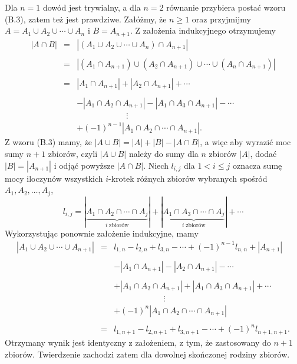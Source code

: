 Dla $n=1$ dowód jest trywialny, a dla $n=2$ równanie przybiera postać wzoru (B.3), zatem też jest prawdziwe. Załóżmy, że $n\ge 1$ oraz przyjmijmy $A=A_1\cup A_2\cup\cdots\cup A_n$ i $B=A_{n+1}$. Z założenia indukcyjnego otrzymujemy
\[
	\begin{array}{rcl}
		|A\cap B| &=& |(A_1\cup A_2\cup\cdots\cup A_n)\cap A_{n+1}| \\\\
		&=& |(A_1\cap A_{n+1})\cup (A_2\cap A_{n+1})\cup\cdots\cup (A_n\cap A_{n+1})| \\\\
		&=& |A_1\cap A_{n+1}|+|A_2\cap A_{n+1}|+\cdots \\\\
		&& -|A_1\cap A_2\cap A_{n+1}|-|A_1\cap A_3\cap A_{n+1}|-\cdots \\
		&& \hspace{1in}\vdots \\
		&& +(-1)^{n-1}|A_1\cap A_2\cap\cdots\cap A_{n+1}|.
	\end{array}
\]
Z wzoru (B.3) mamy, że $|A\cup B|=|A|+|B|-|A\cap B|$, a więc aby wyrazić moc sumy $n+1$ zbiorów, czyli $|A\cup B|$ należy do sumy dla $n$ zbiorów $|A|$, dodać $|B|=|A_{n+1}|$ i odjąć powyższe $|A\cap B|$. Niech $l_{i,j}$ dla $1<i\le j$ oznacza sumę mocy iloczynów wszystkich $i$-krotek różnych zbiorów wybranych spośród $A_1,A_2,\dots,A_j$,
\[
	l_{i,j} = |\underbrace{A_1\cap A_2\cap\cdots\cap A_j}_{i\mathrm{\;zbiorów}}| + |\underbrace{A_1\cap A_3\cap\cdots\cap A_j}_{i\mathrm{\;zbiorów}}| + \cdots
\]
Wykorzystując ponownie założenie indukcyjne, mamy
\[
	\begin{array}{rcl}
		|A_1\cup A_2\cup\cdots\cup A_{n+1}| &=& l_{1,n}-l_{2,n}+l_{3,n}-\cdots+(-1)^{n-1}l_{n,n}+|A_{n+1}| \\\\
		&& -|A_1\cap A_{n+1}|-|A_2\cap A_{n+1}|-\cdots \\\\
		&& +|A_1\cap A_2\cap A_{n+1}|+|A_1\cap A_3\cap A_{n+1}|+\cdots \\
		&& \hspace{1in}\vdots \\
		&& +(-1)^n|A_1\cap A_2\cap\cdots\cap A_{n+1}| \\\\
		&=& l_{1,n+1}-l_{2,n+1}+l_{3,n+1}-\cdots+(-1)^nl_{n+1,n+1}.
	\end{array}
\]
Otrzymany wynik jest identyczny z założeniem, z tym, że zastosowany do $n+1$ zbiorów. Twierdzenie zachodzi zatem dla dowolnej skończonej rodziny zbiorów.

